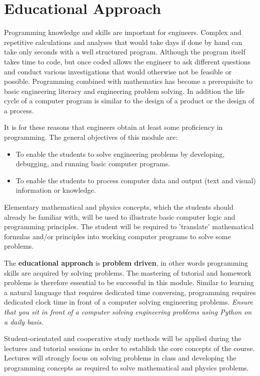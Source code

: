 \section{Educational Approach}
Programming knowledge and skills are important for engineers. Complex
and repetitive calculations and analyses that would take days if done
by hand can take only seconds with a well structured program. Although
the program itself takes time to code, but once coded allows the
engineer to ask different questions and conduct various investigations
that would otherwise not be feasible or possible. Programming combined
with mathematics has become a prerequisite to basic engineering
literacy and engineering problem solving. In addition the life cycle
of a computer program is similar to the design of a product or the
design of a process.

It is for these reasons that engineers obtain at least some
proficiency in programming. The general objectives of this module are:
    \begin{itemize}
        \item To enable the students to solve engineering problems by
            developing, debugging, and running basic computer programs.
        \item To enable the students to process computer data and output
            (text and visual) information or knowledge.
    \end{itemize}

    Elementary mathematical and physics concepts, which the students
    should already be familiar with, will be used to illustrate basic
    computer logic and programming principles. The student will be
    required to 'translate' mathematical formulas and/or principles
    into working computer programs to solve some problems.

    The \textbf{educational approach} is \textbf{problem driven}, in
    other words programming skills are acquired by solving
    problems. The mastering of tutorial and homework problems is
    therefore essential to be successful in this module. Similar to
    learning a natural language that requires dedicated time
    conversing, programming requires dedicated clock time in front of
    a computer solving engineering problems. \textit{Ensure that you sit in
    front of a computer solving engineering problems using Python on a
    daily basis.}

  Student-orientated and cooperative study methods will be applied
  during the lectures and tutorial sessions in order to establish the
  core concepts of the course. Lectures will strongly focus on solving
  problems in class and developing the programming concepts as
  required to solve mathematical and physics problems.

